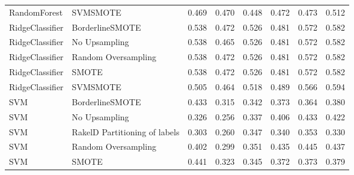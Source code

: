 \begin{tabular}{llllllll}
                   RandomForest &                      SVMSMOTE & 0.469 &                     0.470 &                 0.448 &                  0.472 &                                   0.473 &     0.512 \\
                RidgeClassifier &               BorderlineSMOTE & 0.538 &                     0.472 &                 0.526 &                  0.481 &                                   0.572 &     0.582 \\
                RidgeClassifier &                 No Upsampling & 0.538 &                     0.465 &                 0.526 &                  0.481 &                                   0.572 &     0.582 \\
                RidgeClassifier &           Random Oversampling & 0.538 &                     0.472 &                 0.526 &                  0.481 &                                   0.572 &     0.582 \\
                RidgeClassifier &                         SMOTE & 0.538 &                     0.472 &                 0.526 &                  0.481 &                                   0.572 &     0.582 \\
                RidgeClassifier &                      SVMSMOTE & 0.505 &                     0.464 &                 0.518 &                  0.489 &                                   0.566 &     0.594 \\
                            SVM &               BorderlineSMOTE & 0.433 &                     0.315 &                 0.342 &                  0.373 &                                   0.364 &     0.380 \\
                            SVM &                 No Upsampling & 0.326 &                     0.256 &                 0.337 &                  0.406 &                                   0.433 &     0.422 \\
                            SVM & RakelD Partitioning of labels & 0.303 &                     0.260 &                 0.347 &                  0.340 &                                   0.353 &     0.330 \\
                            SVM &           Random Oversampling & 0.402 &                     0.299 &                 0.351 &                  0.435 &                                   0.445 &     0.437 \\
                            SVM &                         SMOTE & 0.441 &                     0.323 &                 0.345 &                  0.372 &                                   0.373 &     0.379 \\

\end{tabular}
